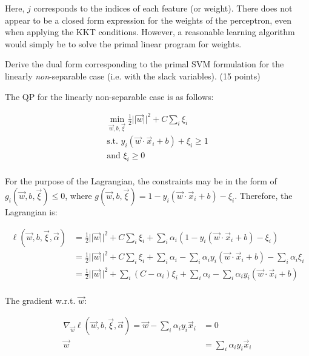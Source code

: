 \documentclass[fleqn]{homework}
\begin{document}
\begin{problem}{3}
    Here, $j$ corresponds to the indices of each feature (or weight).  There
    does not appear to be a closed form expression for the weights of the
    perceptron, even when applying the KKT conditions.  However, a reasonable
    learning algorithm would simply be to solve the primal linear program for
    weights.
  \end{problem}

  \begin{problem}{4}
    \begin{question}
      Derive the dual form corresponding to the primal SVM formulation for the
      linearly \textit{non}-separable case (i.e. with the slack variables). (15
      points)
    \end{question}

    The QP for the linearly non-separable case is as follows:

    \begin{align*}
      \min_{\vec{w},b,\vec{\xi}} \frac{1}{2} ||\vec{w}||^2 + C \sum_i \xi_i \\
      \text{s.t. } y_i(\vec{w}\cdot\vec{x}_i + b) + \xi_i \ge 1 \\
      \text{and } \xi_i \ge 0 \\
    \end{align*}

    For the purpose of the Lagrangian, the constraints may be in the form of
    $g_i(\vec{w}, b, \vec{\xi}) \le 0$, where
    $g(\vec{w}, b, \vec{\xi}) = 1 - y_i (\vec{w} \cdot \vec{x}_i + b) - \xi_i$.
    Therefore, the Lagrangian is:

    \begin{align*}
      \ell(\vec{w}, b, \vec{\xi}, \vec{\alpha}) 
      &= \frac{1}{2}||\vec{w}||^2 + C \sum_i \xi_i + \sum_i
        \alpha_i(1-y_i(\vec{w}\cdot\vec{x}_i + b) - \xi_i) \\
      &= \frac{1}{2}||\vec{w}||^2 + C \sum_i \xi_i + \sum_i
        \alpha_i - \sum_i \alpha_i y_i(\vec{w}\cdot\vec{x}_i + b) - \sum_i
        \alpha_i \xi_i \\
      &= \frac{1}{2}||\vec{w}||^2 + \sum_i(C-\alpha_i) \xi_i + \sum_i
        \alpha_i - \sum_i \alpha_i y_i(\vec{w}\cdot\vec{x}_i + b) \\
    \end{align*}

    The gradient w.r.t. $\vec{w}$:

    \begin{align*}
      \nabla_{\vec{w}}\ell(\vec{w}, b, \vec{\xi}, \vec{\alpha}) 
      = \vec{w} - \sum_i \alpha_i y_i \vec{x}_i &= 0 \\
      \vec{w} &= \sum_i \alpha_i y_i \vec{x}_i
    \end{align*}


\end{problem}
\end{document}
